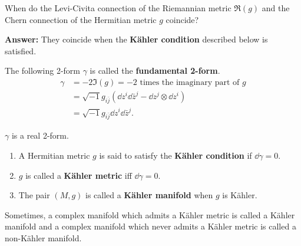 \documentclass[12pt]{article}
\begin{document}
\begin{question}
  When do the Levi-Civita connection of the Riemannian metric \(\Re(g)\) and the
  Chern connection of the Hermitian metric \(g\) coincide?
\end{question}
\textbf{Answer:} They coincide when the \textbf{K\"ahler condition} described
below is satisfied.

\begin{definition}
  The following 2-form \(\gamma\) is called the \textbf{fundamental 2-form}.
  \begin{align*}
    \gamma&=-2\Im(g)=-2\text{ times the imaginary part of }g \\
    &=\sqrt{-1}g_{i\bar{j}}(\dd{z^i}\dd{\bar{z}^j}-\dd{z^j}\otimes \dd{z^i}) \\
    &=\sqrt{-1}g_{i\bar{j}}\dd{z^i}\dd{\bar{z}^j}
  .\end{align*}
\end{definition}
\begin{remark}
  \(\gamma\) is a real 2-form.
\end{remark}
\begin{definition}
\begin{enumerate}[(1)]
\item A Hermitian metric \(g\) is said to satisfy the \textbf{K\"ahler condition}
  if \(\dd{\gamma}=0\).
\item \(g\) is called a \textbf{K\"ahler metric} iff \(\dd{\gamma}=0\).
\item The pair \((M,g)\) is called a \textbf{K\"ahler manifold} when \(g\) is
  K\"ahler. 
\end{enumerate}
\end{definition}
Sometimes, a complex manifold which admits a K\"ahler metric is called a K\"ahler
manifold and a complex manifold which never admits a K\"ahler metric is called a
non-K\"ahler manifold.
\end{document}
